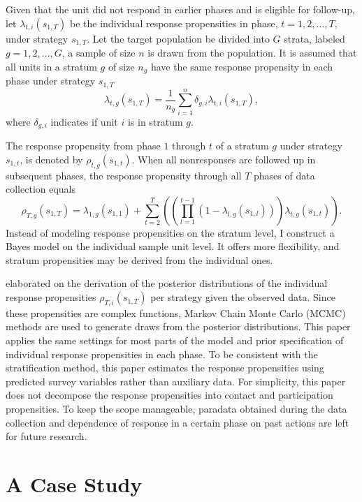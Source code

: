 \documentclass[11pt]{article}
\begin{document}
Given that the unit did not respond in earlier phases and is eligible for follow-up, let $\lambda_{t,i}(s_{1,T})$ be the individual response propensities in phase, $t=1,2,\dots,T$, under strategy $s_{1,T}$. Let the target population be divided into $G$ strata, labeled $g=1,2,\dots,G$, a sample of size $n$ is drawn from the population. It is assumed that all units in a stratum $g$ of size $n_g$ have the same response propensity in each phase under strategy $s_{1,T}$
\begin{equation}
    \lambda_{t,g}(s_{1,T})=\frac{1}{n_g}\sum^{n}_{i=1}\delta_{g,i}\lambda_{t,i}(s_{1,T}),
\end{equation}
where $\delta_{g,i}$ indicates if unit $i$ is in stratum $g$.

The response propensity from phase $1$ through $t$ of a stratum $g$ under strategy $s_{1,t}$, is denoted by $\rho_{t,g}(s_{1,t})$. When all nonresponses are followed up in subsequent phases, the response propensity through all $T$ phases of data collection equals
\begin{equation}
    \rho_{T,g}(s_{1,T})=\lambda_{1,g}(s_{1,1})+\sum^T_{t=2}\left(\left(\prod^{t-1}_{l=1}\left(1-\lambda_{l,g}(s_{1,l})\right)\right)\lambda_{t,g}(s_{1,t})\right).
\end{equation}
Instead of modeling response propensities on the stratum level, I construct a Bayes model on the individual sample unit level. It offers more flexibility, and stratum propensities may be derived from the individual ones.

 elaborated on the derivation of the posterior distributions of the individual response propensities $\rho_{T,i}(s_{1,T})$ per strategy given the observed data. Since these propensities are complex functions, Markov Chain Monte Carlo (MCMC) methods are used to generate draws from the posterior distributions. This paper applies the same settings for most parts of the model and prior specification of individual response propensities in each phase. To be consistent with the stratification method, this paper estimates the response propensities using predicted survey variables rather than auxiliary data. For simplicity, this paper does not decompose the response propensities into contact and participation propensities. To keep the scope manageable, paradata obtained during the data collection and dependence of response in a certain phase on past actions are left for future research.


\section{A Case Study}
\label{sec:Case}
\end{document}
